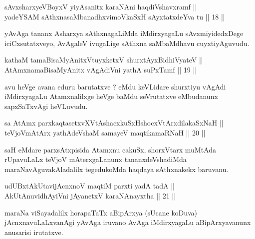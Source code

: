 \begin{shl}
sAvxsharxyeVBoyxV yiyAsanitx karaNAni haqdiVshavxramf || \\
yadeYSAM sAthxnasaMbanadhxvimoVkaSxH sAyxtatxdeYva tu \hfill || 18 ||
  
\end{shl}

\begin{artha}
yAvAga tananx Asharxya sAthxnagaLiMda iMdirxyagaLu sAvxmiyidedxDege
iciCxsutatxveyo, AvAgaleV ivugaLige sAthxna saMbaMdhavu cuyxtiyAguvudu.
\end{artha}

\begin{shl}
kathaM tamaBisaMyAnitxVtuyxketxV shurxtAyx\s BidhiVyateV || \\
AtAmxnamaBisaMyAnitx vAgAdiVni yathA suPxTamf \hfill || 19 ||
 
\end{shl}

\begin{artha}
avu heVge avana eduru barutatxve ? eMdu keVLidare shurxtiyu vAgAdi
iMdirxyagaLu Atamxnalilxge heVge baMdu seVrutatxve eMbudanunx
sapxSaTxvAgi heVLuvudu.
\end{artha}


\begin{shl}
sa AtAmx parxkaqtasetxvXVtAshacxkuSxHshocxVtArxdilakaSxNaH ||  \\
teVjoVmAtArx yathAdeVshaM samayeV maqtikamaRNaH \hfill || 20 ||
  
\end{shl}

\begin{artha}
saH eMdare parxsAtxpisida Atamxnu cakuSx, shorxVtarx muMtAda
rUpavuLaLx teVjoV mAterxgaLanunx tananxdeVshadiMda
maraNavAguvakAladalilx tegedukoMda haqdaya sAthxnakekx baruvanu.
\end{artha}

\begin{shl}
udUBxtAkUtavijAcnxnoV maqtiM parxti yadA tadA || \\
AkUtAnuvidhAyiVni jAyanetxV karaNAnayxtha \hfill || 21 ||
  
\end{shl}

\begin{artha}
maraNa viSayadalilx horapaTaTx aBipArxya (sUcane koDuva)
jAcnxnavuLaLxvanAgi yAvAga iruvano AvAga iMdirxyagaLu
aBipArxyavanunx anusarisi irutatxve.
\end{artha}


